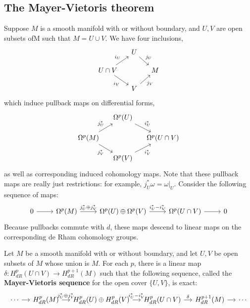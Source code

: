 \subsection{The Mayer-Vietoris theorem}
Suppose $M$ is a smooth manifold with or without boundary, and $U,V$ are open subsets ofM such that $M=U\cup V$. We have four inclusions,
\[\begin{tikzcd}[row sep=12pt,column sep=12pt]
&U\ar[rd,"j_U"]&\\
U\cap V\ar[ru,"i_U"]\ar[rd,swap,"i_V"]&&M\\
&V\ar[ru,swap,"j_V"]&
\end{tikzcd}\]
which induce pullback maps on differential forms,
\[\begin{tikzcd}[row sep=12pt,column sep=12pt]
&\Omega^p(U)\ar[rd,"i_U^*"]&\\
\Omega^p(M)\ar[ru,"j_U^*"]\ar[rd,swap,"j_V^*"]&&\Omega^p(U\cap V)\\
&\Omega^p(V)\ar[ru,swap,"i_V^*"]&
\end{tikzcd}\]
as well as corresponding induced cohomology maps. Note that these pullback maps are really just restrictions: for example, $j_U^*\omega=\omega|_U$. Consider the 
following sequence of maps:
\begin{equation}\label{Mayer-1}
\begin{tikzcd}
0\ar[r]&\Omega^p(M)\ar[r,"j_U^*\oplus j_V^*"]&\Omega^p(U)\oplus\Omega^p(V)\ar[r,"i_U^*-i_V^*"]&\Omega^p(U\cap V)\ar[r]&0
\end{tikzcd}
\end{equation}
Because pullbacks commute with $d$, these maps descend to linear maps on the corresponding de Rham cohomology groups.
\begin{theorem}
Let $M$ be a smooth manifold with or without boundary, and let $U,V$ be open subsets of $M$ whose union is $M$. For each $p$, there is a linear map 
$\delta:H^p_{dR}(U\cap V)\to H^{p+1}_{dR}(M)$ such that the following sequence, called the \textbf{Mayer-Vietoris sequence} for the open cover $\{U,V\}$, is exact:
\[\begin{tikzcd}[column sep=small]
\cdots\ar[r]&H^p_{dR}(M)\ar[r,"j_U^*\oplus j_V^*"]&H^p_{dR}(U)\oplus H^p_{dR}(V)\ar[r,"i_U^*-i_V^*"]&H^p_{dR}(U\cap V)\ar[r,"\delta"]&H^{p+1}_{dR}(M)\ar[r]&\cdots
\end{tikzcd}\]
\end{theorem}
